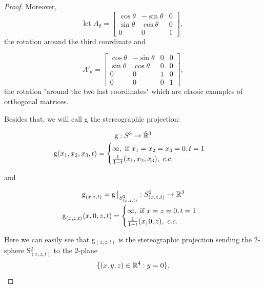 \begin{proof}
Moreover, 
\begin{equation*}
\mbox{let }A_\theta = \begin{bmatrix}
\cos\theta & -\sin\theta & 0\\
\sin\theta & \cos\theta & 0\\
0 & 0 & 1
\end{bmatrix},    
\end{equation*}
 the rotation around the third coordinate and
 
\begin{equation*}
A'_\theta = \begin{bmatrix}
\cos\theta & -\sin\theta & 0 & 0\\
\sin\theta & \cos\theta & 0 & 0\\
0 & 0 & 1 & 0\\
0 & 0 & 0 & 1
\end{bmatrix},
\end{equation*}
the rotation "around the two last coordinates" which are classic examples of orthogonal matrices.

Besides that, we will call g the stereographic projection:

\begin{gather*}
\operatorname{g} : S^3 \rightarrow \hat{\mathbb{R}}^3 \\
\operatorname{g}(x_1, x_2, x_3, t) =
    \begin{cases}
        \infty, \text{ if } x_1 = x_2 = x_3 = 0, t = 1 \\
        \frac{1}{1 - t} (x_1, x_2, x_3), \mbox{ } c.c.
    \end{cases}
\end{gather*}

and

\begin{gather*}
\operatorname{g}_{(x,z,t)} = \restr{\operatorname{g}}{S^2_{(x,z,t)}}: S^2_{(x,z,t)} \rightarrow \R^3
\\
    \operatorname{g}_{(x,z,t)}(x, 0, z, t) =
    \begin{cases}
        \infty, \text{ if } x = z = 0, t = 1 \\
        \frac{1}{1 - t} (x, 0, z), \mbox{ } c.c.
    \end{cases}
\end{gather*}

Here we can easily see that g$_{(x,z,t)}$ is the stereographic projection sending the 2-sphere S$^2_{(x,z,t)}$ to the 2-plane 
\begin{equation*}
    \{(x,y,z) \in \mathbb{R}^4 : y = 0 \}.
\end{equation*}


\end{proof}
